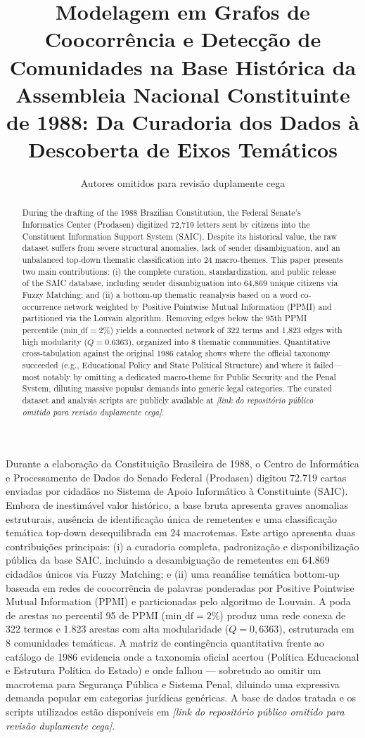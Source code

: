 \documentclass[12pt]{article}
\title{Modelagem em Grafos de Coocorrência e Detecção de Comunidades na Base Histórica da Assembleia Nacional Constituinte de 1988: Da Curadoria dos Dados à Descoberta de Eixos Temáticos}
\author{Autores omitidos para revisão duplamente cega}
\newcommand{\repolink}{\textit{[link do repositório público omitido para revisão duplamente cega]}}
\begin{document}
\maketitle

\begin{abstract}
  During the drafting of the 1988 Brazilian Constitution, the Federal Senate's Informatics Center (Prodasen) digitized 72,719 letters sent by citizens into the Constituent Information Support System (SAIC). Despite its historical value, the raw dataset suffers from severe structural anomalies, lack of sender disambiguation, and an unbalanced top-down thematic classification into 24 macro-themes. This paper presents two main contributions: (i) the complete curation, standardization, and public release of the SAIC database, including sender disambiguation into 64,869 unique citizens via Fuzzy Matching; and (ii) a bottom-up thematic reanalysis based on a word co-occurrence network weighted by Positive Pointwise Mutual Information (PPMI) and partitioned via the Louvain algorithm. Removing edges below the 95th PPMI percentile ($\text{min\_df} = 2\%$) yields a connected network of 322 terms and 1,823 edges with high modularity ($Q = 0.6363$), organized into 8 thematic communities. Quantitative cross-tabulation against the original 1986 catalog shows where the official taxonomy succeeded (e.g., Educational Policy and State Political Structure) and where it failed---most notably by omitting a dedicated macro-theme for Public Security and the Penal System, diluting massive popular demands into generic legal categories. The curated dataset and analysis scripts are publicly available at \repolink.
\end{abstract}

\begin{resumo}
  Durante a elaboração da Constituição Brasileira de 1988, o Centro de Informática e Processamento de Dados do Senado Federal (Prodasen) digitou 72.719 cartas enviadas por cidadãos no Sistema de Apoio Informático à Constituinte (SAIC). Embora de inestimável valor histórico, a base bruta apresenta graves anomalias estruturais, ausência de identificação única de remetentes e uma classificação temática top-down desequilibrada em 24 macrotemas. Este artigo apresenta duas contribuições principais: (i) a curadoria completa, padronização e disponibilização pública da base SAIC, incluindo a desambiguação de remetentes em 64.869 cidadãos únicos via Fuzzy Matching; e (ii) uma reanálise temática bottom-up baseada em redes de coocorrência de palavras ponderadas por Positive Pointwise Mutual Information (PPMI) e particionadas pelo algoritmo de Louvain. A poda de arestas no percentil 95 de PPMI ($\text{min\_df} = 2\%$) produz uma rede conexa de 322 termos e 1.823 arestas com alta modularidade ($Q = 0,6363$), estruturada em 8 comunidades temáticas. A matriz de contingência quantitativa frente ao catálogo de 1986 evidencia onde a taxonomia oficial acertou (Política Educacional e Estrutura Política do Estado) e onde falhou --- sobretudo ao omitir um macrotema para Segurança Pública e Sistema Penal, diluindo uma expressiva demanda popular em categorias jurídicas genéricas. A base de dados tratada e os scripts utilizados estão disponíveis em \repolink.
\end{resumo}
\end{document}
